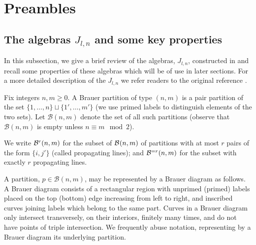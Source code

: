 
\section{Preambles}

\subsection{%
The algebras $J_{l,n}$ and some key properties}
In this subsection, we give a brief {review}
of the algebras, $J_{l,n}$, constructed in \cite{KadarYu} and recall some properties of these algebras which will be of use in later sections. For a more detailed description of the $J_{l,n}$ we refer readers to the original reference \cite{KadarYu}. %


\mdef   \label{de:Brp}
Fix integers $n,m\geq 0$. 
A Brauer partition of type $(n,m)$ is a pair partition of the set $\{1,\dots, n\}\sqcup \{1',\dots, m'\}$ (we use primed labels to distinguish elements of the two sets). Let $\mathcal{B}(n,m)$ denote the set of all such partitions (observe that $\mathcal{B}(n,m)$ is empty unless $n\equiv m\mod 2$). 

We write ${\mathcal B}^{r}(n,m)$ for the subset of  ${\mathcal B}^{}(n,m)$ of partitions with at most $r$ pairs of the form $\{i,j'\}$ 
(called propagating lines); and ${\mathcal B}^{=r}(n,m)$ for the subset with exactly $r$ propagating lines. 

\mdef   \label{pa:left-right}
A partition, $p \in \mathcal{B}(n,m)$, may be represented by a Brauer diagram as follows. 
A Brauer diagram consists of a rectangular region with unprimed (primed) labels placed on the top (bottom) edge 
increasing from left to right, and inscribed curves joining labels which belong to the same part. Curves in a Brauer diagram only intersect transversely, on their interiors, finitely many times, and do not have points of triple intersection. We frequently abuse notation, representing by a Brauer diagram its underlying partition. 

